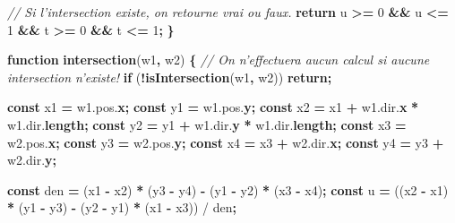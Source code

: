 \documentclass[11pt,french,a4paper,]{article}
\newenvironment{Shaded}{\begin{snugshade}}{\end{snugshade}}
\newcommand{\AttributeTok}[1]{\textcolor[rgb]{0.00,0.36,0.77}{\textbf{#1}}}
\newcommand{\CommentTok}[1]{\textcolor[rgb]{0.35,0.35,0.35}{\textit{#1}}}
\newcommand{\ControlFlowTok}[1]{\textcolor[rgb]{0.68,0.35,0.62}{\textbf{#1}}}
\newcommand{\DecValTok}[1]{\textcolor[rgb]{0.00,0.00,0.81}{#1}}
\newcommand{\KeywordTok}[1]{\textcolor[rgb]{0.68,0.35,0.62}{\textbf{#1}}}
\newcommand{\NormalTok}[1]{#1}
\newcommand{\OperatorTok}[1]{\textcolor[rgb]{0.81,0.36,0.00}{\textbf{#1}}}
\newcommand{\VariableTok}[1]{\textcolor[rgb]{0.90,0.33,0.00}{#1}}
\begin{document}
\begin{Shaded}
\begin{Highlighting}[]
\CommentTok{// Si l’intersection existe, on retourne vrai ou faux.}
    \ControlFlowTok{return}\NormalTok{ u }\OperatorTok{>=} \DecValTok{0} \OperatorTok{&&}\NormalTok{ u }\OperatorTok{<=} \DecValTok{1} \OperatorTok{&&}\NormalTok{ t }\OperatorTok{>=} \DecValTok{0} \OperatorTok{&&}\NormalTok{ t }\OperatorTok{<=} \DecValTok{1}\OperatorTok{;}
\OperatorTok{\}}

\KeywordTok{function} \AttributeTok{intersection}\NormalTok{(w1}\OperatorTok{,}\NormalTok{ w2) }\OperatorTok{\{}
\CommentTok{// On n’effectuera aucun calcul si aucune intersection n’existe!}
    \ControlFlowTok{if}\NormalTok{ (}\OperatorTok{!}\AttributeTok{isIntersection}\NormalTok{(w1}\OperatorTok{,}\NormalTok{ w2)) }\ControlFlowTok{return}\OperatorTok{;}

    \KeywordTok{const}\NormalTok{ x1 }\OperatorTok{=} \VariableTok{w1}\NormalTok{.}\VariableTok{pos}\NormalTok{.}\AttributeTok{x}\OperatorTok{;}
    \KeywordTok{const}\NormalTok{ y1 }\OperatorTok{=} \VariableTok{w1}\NormalTok{.}\VariableTok{pos}\NormalTok{.}\AttributeTok{y}\OperatorTok{;}
    \KeywordTok{const}\NormalTok{ x2 }\OperatorTok{=}\NormalTok{ x1 }\OperatorTok{+} \VariableTok{w1}\NormalTok{.}\VariableTok{dir}\NormalTok{.}\AttributeTok{x} \OperatorTok{*} \VariableTok{w1}\NormalTok{.}\VariableTok{dir}\NormalTok{.}\AttributeTok{length}\OperatorTok{;}
    \KeywordTok{const}\NormalTok{ y2 }\OperatorTok{=}\NormalTok{ y1 }\OperatorTok{+} \VariableTok{w1}\NormalTok{.}\VariableTok{dir}\NormalTok{.}\AttributeTok{y} \OperatorTok{*} \VariableTok{w1}\NormalTok{.}\VariableTok{dir}\NormalTok{.}\AttributeTok{length}\OperatorTok{;}
    \KeywordTok{const}\NormalTok{ x3 }\OperatorTok{=} \VariableTok{w2}\NormalTok{.}\VariableTok{pos}\NormalTok{.}\AttributeTok{x}\OperatorTok{;}
    \KeywordTok{const}\NormalTok{ y3 }\OperatorTok{=} \VariableTok{w2}\NormalTok{.}\VariableTok{pos}\NormalTok{.}\AttributeTok{y}\OperatorTok{;}
    \KeywordTok{const}\NormalTok{ x4 }\OperatorTok{=}\NormalTok{ x3 }\OperatorTok{+} \VariableTok{w2}\NormalTok{.}\VariableTok{dir}\NormalTok{.}\AttributeTok{x}\OperatorTok{;}
    \KeywordTok{const}\NormalTok{ y4 }\OperatorTok{=}\NormalTok{ y3 }\OperatorTok{+} \VariableTok{w2}\NormalTok{.}\VariableTok{dir}\NormalTok{.}\AttributeTok{y}\OperatorTok{;}

    \KeywordTok{const}\NormalTok{ den }\OperatorTok{=}\NormalTok{ (x1 }\OperatorTok{-}\NormalTok{ x2) }\OperatorTok{*}\NormalTok{ (y3 }\OperatorTok{-}\NormalTok{ y4) }\OperatorTok{-}\NormalTok{ (y1 }\OperatorTok{-}\NormalTok{ y2) }\OperatorTok{*}\NormalTok{ (x3 }\OperatorTok{-}\NormalTok{ x4)}\OperatorTok{;}
    \KeywordTok{const}\NormalTok{ u }\OperatorTok{=}\NormalTok{ ((x2 }\OperatorTok{-}\NormalTok{ x1) }\OperatorTok{*}\NormalTok{ (y1 }\OperatorTok{-}\NormalTok{ y3) }\OperatorTok{-}\NormalTok{ (y2 }\OperatorTok{-}\NormalTok{ y1) }\OperatorTok{*}\NormalTok{ (x1 }\OperatorTok{-}\NormalTok{ x3)) / den}\OperatorTok{;}


\end{Highlighting}
\end{Shaded}
\end{document}

